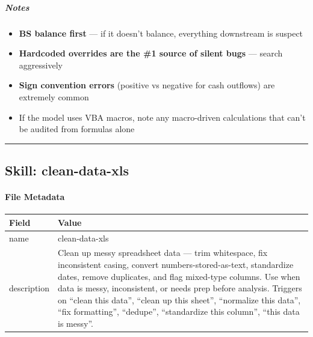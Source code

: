 \documentclass[11pt]{article}
\begin{document}
\subparagraph{Notes}\mbox{}\par

\begin{itemize}[leftmargin=*,itemsep=2pt,topsep=2pt]
\item {} \textbf{BS balance first} — if it doesn't balance, everything downstream is suspect
\item {} \textbf{Hardcoded overrides are the \#1 source of silent bugs} — search aggressively
\item {} \textbf{Sign convention errors} (positive vs negative for cash outflows) are extremely common
\item {} If the model uses VBA macros, note any macro-driven calculations that can't be audited from formulas alone
\end{itemize}

\vspace{0.8em}\hrule\vspace{0.8em}

\subsection{Skill: clean-data-xls}\label{file:skills-clean-data-xls-SKILL-md}

\paragraph{File Metadata}\mbox{}\par
\begingroup
\small
\setlength{\tabcolsep}{2pt}
\begin{longtable}{>{\RaggedRight\arraybackslash\hspace{0pt}}p{}>{\RaggedRight\arraybackslash\hspace{0pt}}p{}}
\toprule
{} \textbf{Field} & \textbf{Value} \\
\midrule
{} name & clean-data-xls \\
{} description & Clean up messy spreadsheet data — trim whitespace, fix inconsistent casing, convert numbers-stored-as-text, standardize dates, remove duplicates, and flag mixed-type columns. Use when data is messy, inconsistent, or needs prep before analysis. Triggers on ``clean this data'', ``clean up this sheet'', ``normalize this data'', ``fix formatting'', ``dedupe'', ``standardize this column'', ``this data is messy''. \\
\bottomrule
\end{longtable}
\endgroup
\end{document}
